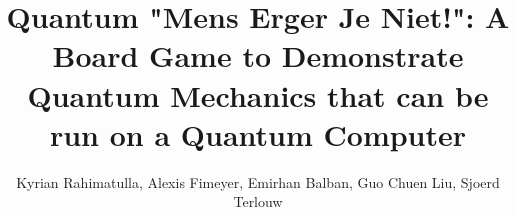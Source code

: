 \documentclass[final,5p,times,twocolumn,authoryear]{elsarticle}
\begin{document}
\begin{frontmatter}



\title{Quantum "Mens Erger Je Niet!": A Board Game to Demonstrate Quantum Mechanics that can be run on a Quantum Computer}


\author[first]{Kyrian Rahimatulla, Alexis Fimeyer, Emirhan Balban, Guo Chuen Liu, Sjoerd Terlouw}


\end{frontmatter}
\end{document}
